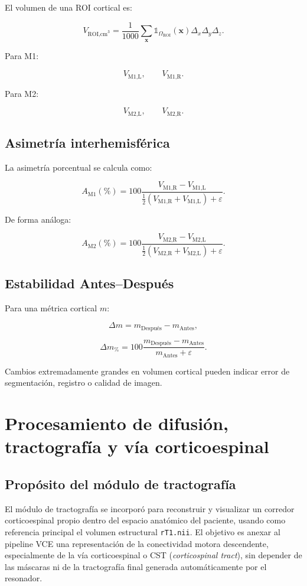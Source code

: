 \documentclass[12pt,a4paper]{article}
\begin{document}
El volumen de una ROI cortical es:

\[
V_{\text{ROI,cm}^3}
=
\frac{1}{1000}
\sum_{\mathbf{x}}
\mathbb{1}_{\Omega_{\text{ROI}}}(\mathbf{x})
\Delta_x\Delta_y\Delta_z.
\]

Para M1:

\[
V_{\text{M1,L}},\qquad V_{\text{M1,R}}.
\]

Para M2:

\[
V_{\text{M2,L}},\qquad V_{\text{M2,R}}.
\]

\subsection{Asimetría interhemisférica}

La asimetría porcentual se calcula como:

\[
A_{\text{M1}}(\%)
=
100
\frac{V_{\text{M1,R}}-V_{\text{M1,L}}}
{\frac{1}{2}(V_{\text{M1,R}}+V_{\text{M1,L}})+\varepsilon}.
\]

De forma análoga:

\[
A_{\text{M2}}(\%)
=
100
\frac{V_{\text{M2,R}}-V_{\text{M2,L}}}
{\frac{1}{2}(V_{\text{M2,R}}+V_{\text{M2,L}})+\varepsilon}.
\]

\subsection{Estabilidad Antes--Después}

Para una métrica cortical \(m\):

\[
\Delta m = m_{\text{Después}}-m_{\text{Antes}},
\]

\[
\Delta m_{\%}
=
100\frac{m_{\text{Después}}-m_{\text{Antes}}}
{m_{\text{Antes}}+\varepsilon}.
\]

Cambios extremadamente grandes en volumen cortical pueden indicar error de segmentación, registro o calidad de imagen.


\section{Procesamiento de difusión, tractografía y vía corticoespinal}

\subsection{Propósito del módulo de tractografía}

El módulo de tractografía se incorporó para reconstruir y visualizar un corredor corticoespinal propio dentro del espacio anatómico del paciente, usando como referencia principal el volumen estructural \texttt{rT1.nii}. El objetivo es anexar al pipeline VCE una representación de la conectividad motora descendente, especialmente de la vía corticoespinal o CST (\textit{corticospinal tract}), sin depender de las máscaras ni de la tractografía final generada automáticamente por el resonador.
\end{document}
